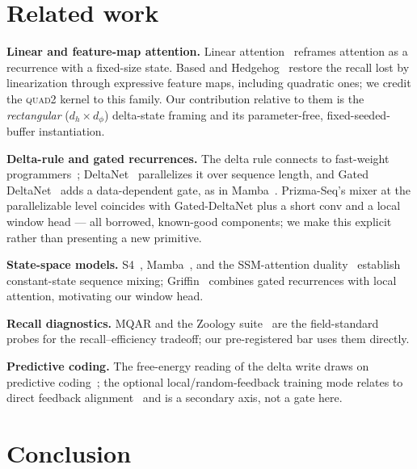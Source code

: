 \documentclass[11pt]{article}
\newcommand{\dphi}{d_{\phi}}
\newcommand{\dhd}{d_{h}}
\newcommand{\quadtwo}{\textsc{quad2}}
\begin{document}
\section{Related work}
\label{sec:related}

\textbf{Linear and feature-map attention.} Linear attention~\cite{katharopoulos2020transformers,
choromanski2021performer} reframes attention as a recurrence with a fixed-size state. Based and
Hedgehog~\cite{arora2024based,zhang2024hedgehog} restore the recall lost by linearization through
expressive feature maps, including quadratic ones; we credit the \quadtwo{} kernel to this family.
Our contribution relative to them is the \emph{rectangular} ($\dhd\times\dphi$) delta-state framing
and its parameter-free, fixed-seeded-buffer instantiation.

\textbf{Delta-rule and gated recurrences.} The delta rule connects to fast-weight
programmers~\cite{schlag2021linear}; DeltaNet~\cite{yang2024deltanet} parallelizes it over sequence
length, and Gated DeltaNet~\cite{yang2024gateddeltanet} adds a data-dependent gate, as in
Mamba~\cite{gu2024mamba}. Prizma-Seq's mixer at the parallelizable level coincides with Gated-DeltaNet
plus a short conv and a local window head --- all borrowed, known-good components; we make this
explicit rather than presenting a new primitive.

\textbf{State-space models.} S4~\cite{gu2022s4}, Mamba~\cite{gu2024mamba}, and the SSM-attention
duality~\cite{dao2024mamba2} establish constant-state sequence mixing; Griffin~\cite{de2024griffin}
combines gated recurrences with local attention, motivating our window head.

\textbf{Recall diagnostics.} MQAR and the Zoology suite~\cite{arora2024zoology} are the
field-standard probes for the recall--efficiency tradeoff; our pre-registered bar uses them
directly.

\textbf{Predictive coding.} The free-energy reading of the delta write
draws on predictive coding~\cite{rao1999predictive,friston2010free}; the optional local/random-feedback
training mode relates to direct feedback alignment~\cite{nokland2016dfa} and is a secondary axis, not
a gate here.

\section{Conclusion}
\label{sec:conclusion}
\end{document}
